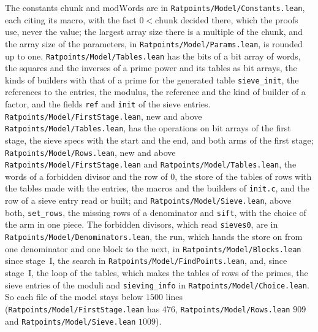 The constants $\mathrm{chunk}$ and $\mathrm{modWords}$ are in \verb|Ratpoints/Model/Constants.lean|,
each citing its macro, with the fact $0 < \mathrm{chunk}$ decided there, which the proofs use, never
the value; the largest array size there is a multiple of the chunk, and the array size of the
parameters, in \verb|Ratpoints/Model/Params.lean|, is rounded up to one.
\verb|Ratpoints/Model/Tables.lean| has the bits of a bit array of words, the squares and the
inverses of a prime power and its tables as bit arrays, the kinds of builders with that of a prime
for the generated table \verb|sieve_init|, the references to the entries, the modulus, the reference
and the kind of builder of a factor, and the fields \verb|ref| and \verb|init| of the sieve entries.
\verb|Ratpoints/Model/FirstStage.lean|, new and above \verb|Ratpoints/Model/Tables.lean|, has the
operations on bit arrays of the first stage, the sieve specs with the start and the end, and both
arms of the first stage; \verb|Ratpoints/Model/Rows.lean|, new and above
\verb|Ratpoints/Model/FirstStage.lean| and \verb|Ratpoints/Model/Tables.lean|, the words of a
forbidden divisor and the row of $0$, the store of the tables of rows with the tables made with the
entries, the macros and the builders of \verb|init.c|, and the row of a sieve entry read or built;
and \verb|Ratpoints/Model/Sieve.lean|, above both, \verb|set_rows|, the missing rows of a
denominator and \verb|sift|, with the choice of the arm in one piece. The forbidden divisors, which
read \verb|sieves0|, are in \verb|Ratpoints/Model/Denominators.lean|, the run, which hands the store
on from one denominator and one block to the next, in \verb|Ratpoints/Model/Blocks.lean| since
stage~I, the search in \verb|Ratpoints/Model/FindPoints.lean|, and, since stage~I, the loop of the
tables, which makes the tables of rows of the primes, the sieve entries of the moduli and
\verb|sieving_info| in \verb|Ratpoints/Model/Choice.lean|. So each file of the model stays below
$1500$ lines (\verb|Ratpoints/Model/FirstStage.lean| has $476$, \verb|Ratpoints/Model/Rows.lean|
$909$ and \verb|Ratpoints/Model/Sieve.lean| $1009$).

